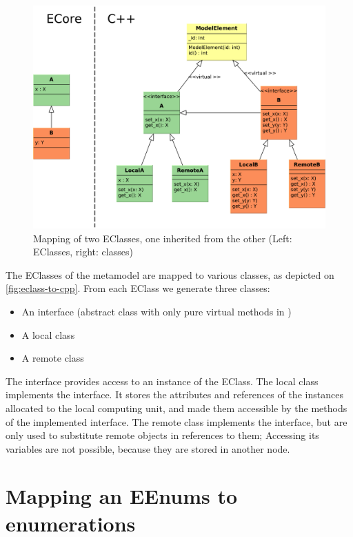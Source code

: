 \begin{figure}
	\begin{center}
		\includegraphics[width=\textwidth]{figures/eclass-to-cpp.pdf}
		\caption{Mapping of two EClasses, one inherited from the other (Left: EClasses, right: \protect\cpp{} classes) }
		\label{fig:eclass-to-cpp}
	\end{center}
\end{figure}


The EClasses of the metamodel are mapped to various \cpp{} classes, as depicted on \mbox{\autoref{fig:eclass-to-cpp}}.
From each EClass we generate three \cpp{} classes:

\begin{itemize}
	\item An interface (abstract class with only pure virtual methods in \cpp{})
	\item A local class
	\item A remote class
\end{itemize}


The interface provides access to an instance of the EClass.
The local class implements the interface. It stores the attributes and references of the instances allocated to the local computing unit, and made them accessible by the methods of the implemented interface.
The remote class implements the interface, but are only used to substitute remote objects in references to them; 
Accessing its variables are not possible, because they are stored in another node. 

\section{Mapping an EEnums to \protect\cpptt{} enumerations }


